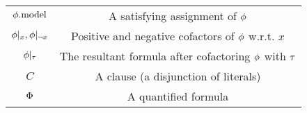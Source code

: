 \begin{table}[t]
\begin{tabular}{c|c}
        $\phi.\mathrm{model}$               & A satisfying assignment of $\phi$                              \\
        $\phi|_{x},\phi|_{\lnot x}$ & Positive and negative cofactors of $\phi$ w.r.t. $x$           \\
        $\phi|_{\tau}$            & The resultant formula after cofactoring $\phi$ with $\tau$      \\
        $C$                         & A clause (a disjunction of literals)                          \\
        $\Phi$                       & A quantified formula                                          \\
    \end{tabular}
\end{table}




